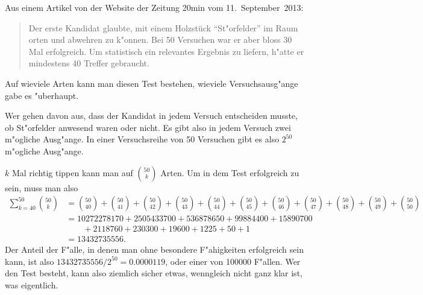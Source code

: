 Aus einem Artikel von der Website der Zeitung 20min vom 11.~September~2013:
\begin{quotation}
Der erste Kandidat glaubte, mit einem Holzstück ``St"orfelder'' im Raum
orten und abwehren zu k"onnen.
Bei 50 Versuchen war er aber bloss 30 Mal erfolgreich. Um statistisch
ein relevantes Ergebnis zu liefern, h"atte er mindestens 40 Treffer gebraucht.
\end{quotation}
Auf wieviele Arten kann man diesen Test bestehen, wieviele Versuchsausg"ange
gabe es "uberhaupt.

\begin{loesung}
Wer gehen davon aus, dass der Kandidat in jedem Versuch entscheiden musste,
ob St"orfelder anwesend waren oder nicht. Es gibt also in jedem Versuch
zwei m"ogliche Ausg"ange. In einer Versuchsreihe von 50 Versuchen gibt
es also $2^{50}$ m"ogliche Ausg"ange.

$k$ Mal richtig tippen kann man auf
$\binom{50}{k}$ Arten. Um in dem Test erfolgreich zu sein, muss man also
\begin{align*}
\sum_{k=40}^{50}\binom{50}{k}
&=
\binom{50}{40}
+
\binom{50}{41}
+
\binom{50}{42}
+
\binom{50}{43}
+
\binom{50}{44}
+
\binom{50}{45}
+
\binom{50}{46}
+
\binom{50}{47}
+
\binom{50}{48}
+
\binom{50}{49}
+
\binom{50}{50}
\\
&=
10272278170
+
2505433700
+
536878650
+
99884400
+
15890700
\\
&\qquad+
2118760
+
230300
+
19600
+
1225
+
50
+
1
\\
&=13432735556.
\end{align*}
Der Anteil der F"alle, in denen man ohne besondere F"ahigkeiten 
erfolgreich sein kann, ist also $13432735556/2^{50}=0.0000119$,
oder einer von 100000 F"allen. Wer den Test besteht, kann also ziemlich
sicher etwas, wenngleich nicht ganz klar ist, was eigentlich.
\end{loesung}
